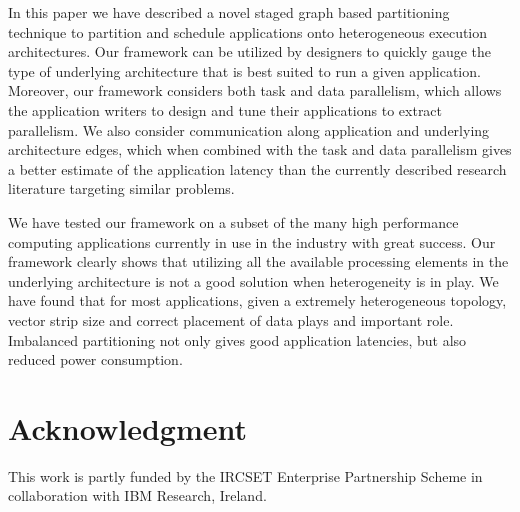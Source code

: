 \documentclass[10pt, conference, compsocconf]{IEEEtran}
\begin{document}
In this paper we have described a novel staged graph based partitioning
technique to partition and schedule applications onto heterogeneous
execution architectures. Our framework can be utilized by designers to
quickly gauge the type of underlying architecture that is best suited to
run a given application. Moreover, our framework considers both task and
data parallelism, which allows the application writers to design and
tune their applications to extract parallelism. We also consider
communication along application and underlying architecture edges, which
when combined with the task and data parallelism gives a better estimate
of the application latency than the currently described research
literature targeting similar problems.

We have tested our framework on a subset of the many high performance
computing applications currently in use in the industry with great
success. Our framework clearly shows that utilizing all the available
processing elements in the underlying architecture is not a good
solution when heterogeneity is in play. We have found that for most
applications, given a extremely heterogeneous topology, vector strip
size and correct placement of data plays and important role. Imbalanced
partitioning not only gives good application latencies, but also reduced
power consumption.

\section{Acknowledgment}
This work is partly funded by the IRCSET Enterprise Partnership Scheme
in collaboration with IBM Research, Ireland.






%
%
%

\scriptsize{

% 

}

\end{document}
